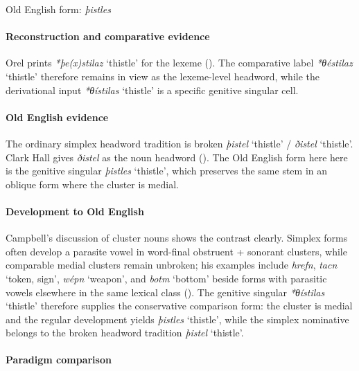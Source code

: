 \documentclass[
  british,
  a4paper,
]{article}
\providecommand{\Recon}[1]{\emph{*#1}}
\begin{document}
Old English form: \emph{þistles}

\paragraph{Reconstruction and comparative
evidence}\label{reconstruction-and-comparative-evidence-147}

Orel prints \emph{*þe(x)stilaz} `thistle' for the lexeme
(). The comparative label
\Recon{θéstilaz} `thistle' therefore remains in view as the lexeme-level
headword, while the derivational input \Recon{θístilas} `thistle' is a
specific genitive singular cell.

\paragraph{Old English evidence}\label{old-english-evidence-149}

The ordinary simplex headword tradition is broken {\emph{þistel}}
`thistle' / {\emph{ðistel}} `thistle'. Clark Hall gives {\emph{ðistel}}
as the noun headword (). The Old English form here here is the genitive singular
{\emph{þistles}} `thistle', which preserves the same stem in an oblique
form where the cluster is medial.

\paragraph{Development to Old
English}\label{development-to-old-english-148}

Campbell's discussion of cluster nouns shows the contrast clearly.
Simplex forms often develop a parasite vowel in word-final obstruent +
sonorant clusters, while comparable medial clusters remain unbroken; his
examples include \emph{hrefn}, {\emph{tacn}} `token, sign',
{\emph{wépn}} `weapon', and {\emph{botm}} `bottom' beside forms with
parasitic vowels elsewhere in the same lexical class
(). The genitive singular
\Recon{θístilas} `thistle' therefore supplies the conservative
comparison form: the cluster is medial and the regular development
yields {\emph{þistles}} `thistle', while the simplex nominative belongs
to the broken headword tradition {\emph{þistel}} `thistle'.

\paragraph{Paradigm comparison}\label{paradigm-comparison-24}
\end{document}

